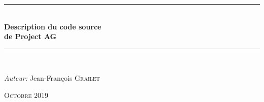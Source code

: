 \documentclass[a4paper,titlepage,11pt]{report}
\newcommand{\HRule}{\rule{\linewidth}{0.5mm}} %
\begin{document}
\begin{titlepage}

\center %
 

\HRule \\[0.4cm]
{ \huge \bfseries Description du code source\\
de Project AG
}\\[0.4cm]
\HRule \\[5cm]
 

\begin{minipage}{0.4\textwidth}
\begin{flushleft} \large
\emph{Auteur:}
Jean-François \textsc{Grailet}
\end{flushleft}
\end{minipage}


\textsc{\large Octobre 2019}\\[0.5cm]



\vfill %

\end{titlepage}


\newpage
\setcounter{page}{1}
\tableofcontents 
\newpage
\setcounter{page}{1}








\end{document}

